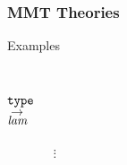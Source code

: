 \begin{frame}
\frametitle{MMT Theories}
\begin{block}{Examples}
\vspace{-.3em}
\begin{columns}
\begin{twelfsig}
\tsig{\Forms}\\
$\mathtt{type}$\\
$\rightarrow$\\
$\mathit{lam}$\\
\decl{\form}{\kity}\\
\decl{\ded}{\form\to\kity}\\
\tsigend
\end{twelfsig}

\begin{twelfsig}
\tsig{\FOL}\\
\tinclude{\Forms}{}\\
\decl{\term}{\kity}\\
\decl{\wedge}{\form\to\form\to\form}\\
$\vdots$\\%
\decl{\exists}{(\term\to\form)\to\form}\\
\tsigend
\end{twelfsig}
\end{columns}
\end{block}
\end{frame}